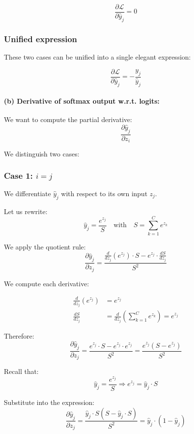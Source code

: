 \documentclass[11pt]{article}
\begin{document}
\[
\frac{\partial \mathcal{L}}{\partial \hat{y}_j} = 0
\]

\subsubsection*{Unified expression}

These two cases can be unified into a single elegant expression:

\[
\boxed{
\frac{\partial \mathcal{L}}{\partial \hat{y}_j} = -\frac{y_j}{\hat{y}_j}
}
\]


\paragraph{(b) Derivative of softmax output w.r.t. logits:}

We want to compute the partial derivative:
\[
\frac{\partial \hat{y}_j}{\partial z_i}
\]

We distinguish two cases:

\subsubsection*{Case 1: \texorpdfstring{$i = j$}{i = j}}

We differentiate \( \hat{y}_j \) with respect to its own input \( z_j \).

\vspace{0.5em}
Let us rewrite:
\[
\hat{y}_j = \frac{e^{z_j}}{S}
\quad \text{with} \quad S = \sum_{k=1}^C e^{z_k}
\]

We apply the quotient rule:
\[
\frac{\partial \hat{y}_j}{\partial z_j}
= \frac{ \frac{d}{dz_j}(e^{z_j}) \cdot S - e^{z_j} \cdot \frac{dS}{dz_j} }{S^2}
\]

We compute each derivative:

\begin{align*}
\frac{d}{dz_j}(e^{z_j}) &= e^{z_j} \\
\frac{dS}{dz_j} &= \frac{d}{dz_j} \left( \sum_{k=1}^C e^{z_k} \right) = e^{z_j}
\end{align*}

Therefore:
\[
\frac{\partial \hat{y}_j}{\partial z_j}
= \frac{ e^{z_j} \cdot S - e^{z_j} \cdot e^{z_j} }{S^2}
= \frac{ e^{z_j} (S - e^{z_j}) }{S^2}
\]

Recall that:
\[
\hat{y}_j = \frac{e^{z_j}}{S}
\Rightarrow e^{z_j} = \hat{y}_j \cdot S
\]

Substitute into the expression:
\[
\frac{\partial \hat{y}_j}{\partial z_j}
= \frac{ \hat{y}_j \cdot S (S - \hat{y}_j \cdot S) }{S^2}
= \hat{y}_j \cdot \left( 1 - \hat{y}_j \right)
\]
\end{document}

